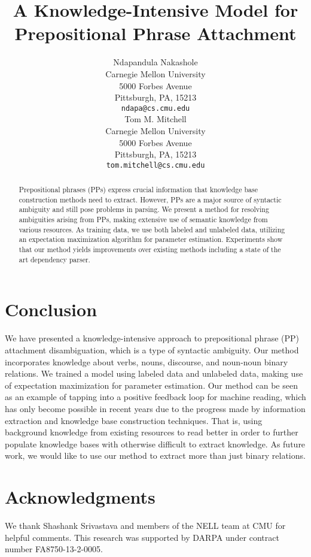 \documentclass[11pt,a4paper]{article}
\title{A Knowledge-Intensive Model for Prepositional Phrase Attachment}
\author{Ndapandula Nakashole \\
  Carnegie Mellon University \\
  5000 Forbes Avenue \\
  Pittsburgh, PA, 15213 \\
  {\tt ndapa@cs.cmu.edu} \\\And
  Tom M. Mitchell \\
  Carnegie Mellon University \\
  5000 Forbes Avenue \\
  Pittsburgh, PA, 15213 \\
  {\tt tom.mitchell@cs.cmu.edu} \\}
\date{}
\begin{document}
\maketitle

\begin{abstract}
Prepositional phrases (PPs) express crucial information that  knowledge base construction  methods need to extract.  However, PPs are a major source of syntactic ambiguity and  still pose problems in parsing. We present a method 
 for resolving  ambiguities arising from PPs, making extensive use of   semantic  knowledge from various resources.
As training data, we use both labeled and unlabeled data,  utilizing an expectation maximization algorithm for parameter estimation.  Experiments show that our method yields improvements over existing methods including a state of the art dependency parser.

\end{abstract}





\section{Conclusion}
We have presented a knowledge-intensive  approach to prepositional phrase (PP) attachment disambiguation, which is  a type of syntactic ambiguity. Our method incorporates  knowledge about verbs, nouns, discourse, and noun-noun binary relations.   We trained a model using labeled data and unlabeled data, making use of expectation maximization for  parameter estimation.
Our method can be seen as an example of tapping into a positive feedback loop for machine reading, which has only become possible in recent years due to the progress made by  information extraction and knowledge base construction techniques. That is, using  background  knowledge from existing  resources to read better in order to further populate  knowledge bases with otherwise difficult to extract knowledge.
As future work, we would like to use our method to extract more than just binary relations.
\section*{Acknowledgments}
We thank Shashank Srivastava and  members of the NELL team at CMU for  helpful comments.
This research was supported by
DARPA under contract number FA8750-13-2-0005. 

\clearpage
\nocite{*}


\end{document}
